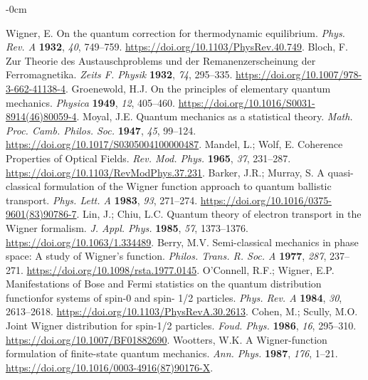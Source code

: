 \documentclass[quantumrep,article,accept,pdftex,moreauthors]{Definitions/mdpi}
\begin{document}
\begin{adjustwidth}{-\extralength}{0cm}
\begin{thebibliography}{999}
 Wigner, E. On the quantum correction for thermodynamic
equilibrium. \textit{Phys. Rev. A} \textbf{1932}, \textit{40}, 749--759.
\url{https://doi.org/10.1103/PhysRev.40.749}.
 Bloch, F. Zur Theorie des Austauschproblems und der
Remanenzerscheinung der Ferromagnetika. \textit{Zeits F. Physik} \textbf{1932},
\textit{74}, 295--335. \url{https://doi.org/10.1007/978-3-662-41138-4}.
 Groenewold, H.J. On the principles of elementary
quantum mechanics. \textit{Physica} \textbf{1949}, \textit{12}, 405--460.
\url{https://doi.org/10.1016/S0031-8914(46)80059-4}.
 Moyal, J.E. Quantum mechanics as a statistical theory. 
\textit{Math. Proc. Camb. Philos. Soc. } 
\textbf{1947}, \textit{45}, 99--124. \url{https://doi.org/10.1017/S0305004100000487}.
 Mandel, L.; Wolf, E. Coherence Properties of Optical
Fields. \textit{Rev. Mod. Phys.} \textbf{1965}, \textit{37}, 231--287.
\url{https://doi.org/10.1103/RevModPhys.37.231}.
 Barker, J.R.; Murray, S. A quasi-classical formulation
of the Wigner function approach to quantum ballistic transport. \textit{Phys.
Lett. A} \textbf{1983}, \textit{93}, 271--274. \url{https://doi.org/10.1016/0375-9601(83)90786-7}.
 Lin, J.; Chiu, L.C. Quantum theory of electron
transport in the Wigner formalism. \textit{J. Appl. Phys.} \textbf{1985}, 
\textit{57}, 1373--1376. \url{https://doi.org/10.1063/1.334489}.
 Berry, M.V. Semi-classical mechanics in phase space: A
study of Wigner's function. \textit{Philos. Trans. R. Soc. A} \textbf{1977}, 
\textit{287}, 237--271. \url{https://doi.org/10.1098/rsta.1977.0145}.
 O'Connell, R.F.; Wigner, E.P. Manifestations of Bose and
Fermi statistics on the quantum distribution functionfor systems of spin-0
and spin- 1/2 particles. \textit{Phys. Rev. A} \textbf{1984}, \textit{30},
2613--2618. \url{https://doi.org/10.1103/PhysRevA.30.2613}.
 Cohen, M.; Scully, M.O. Joint Wigner distribution for
spin-1/2 particles. \textit{Foud. Phys.} \textbf{1986}, \textit{16},
295--310. \url{https://doi.org/10.1007/BF01882690}.
  Wootters, W.K. A Wigner-function formulation of
finite-state quantum mechanics. \textit{Ann. Phys.} \textbf{1987},
\textit{176}, 1--21. \url{https://doi.org/10.1016/0003-4916(87)90176-X}.

\end{thebibliography}
\end{adjustwidth}
\end{document}
